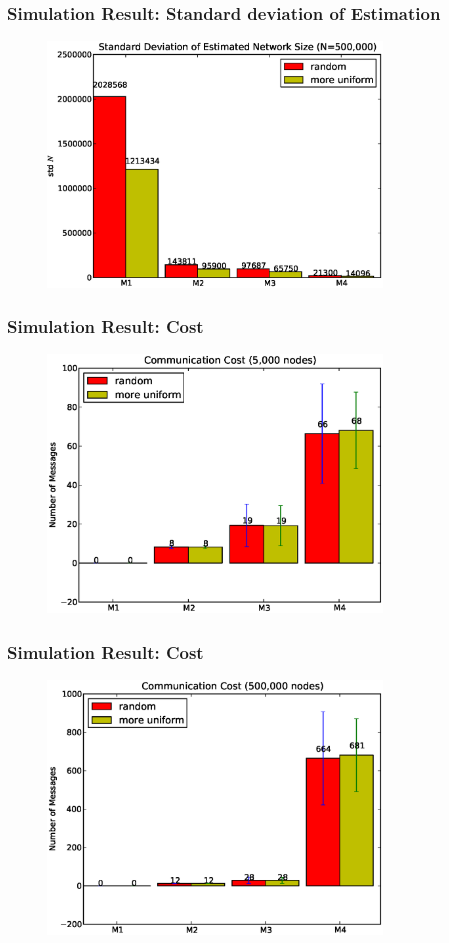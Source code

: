 \documentclass[red]{beamer}
\begin{document}
\begin{frame}
\frametitle{Simulation Result: Standard deviation of Estimation}
\begin{figure}
\centering
\includegraphics[width=3.5in]{figs/size500k_std}
\end{figure}
\end{frame}
\begin{frame}
\frametitle{Simulation Result: Cost}
\begin{figure}
\centering
\includegraphics[width=3.5in]{figs/cost5k}
\end{figure}
\end{frame}
\begin{frame}
\frametitle{Simulation Result: Cost}
\begin{figure}
\centering
\includegraphics[width=3.5in]{figs/cost500k}
\end{figure}
\end{frame}
\end{document}
